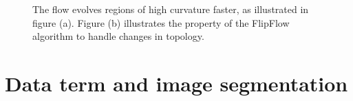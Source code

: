 \begin{figure}
\center
{}

\caption{The flow evolves regions of high curvature faster, as illustrated in figure (a). Figure (b) illustrates the property of the FlipFlow algorithm to handle changes in topology.}
\label{fig:handle-topology-different-speed}
\end{figure}


\section{Data term and image segmentation}
\label{ch7:sec:data-term-image-segmentation}

